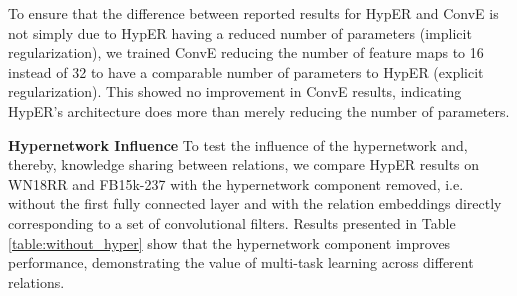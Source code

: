 \documentclass[runningheads]{llncs}
\newcommand{\keypoint}[1]{\vspace{0.1cm}\noindent\textbf{#1}\quad}
\begin{document}
\begin{table}[!htbp]
	\centering
	 \caption{Link prediction results on WN18RR; all models trained with 200 dimension embeddings and 1-N scoring.}
     \label{table:wn18rr_our}
     \vspace{-0.2cm}
 \end{table}

 To ensure that the difference between reported results for HypER and ConvE is not simply due to HypER having a reduced number of parameters (implicit regularization), we trained ConvE reducing the number of feature maps to 16 instead of 32 to have a comparable number of parameters to HypER (explicit regularization). This showed no improvement in ConvE results, indicating HypER's architecture does more than merely reducing the number of parameters.

\begin{table}[!ht]
	\centering
	\caption{Results with and without hypernetwork on WN18RR and FB15k-237.}
    \label{table:without_hyper}
    \vspace{-0.8cm}
 \end{table}
\keypoint{Hypernetwork Influence} To test the influence of the hypernetwork and, thereby, knowledge sharing between relations, we compare HypER results on WN18RR and FB15k-237 with the hypernetwork component removed, i.e. without the first fully connected layer and with the relation embeddings directly corresponding to a set of convolutional filters. Results presented in Table \ref{table:without_hyper} show that the hypernetwork component improves performance, demonstrating the value of multi-task learning across different relations.
\end{document}
